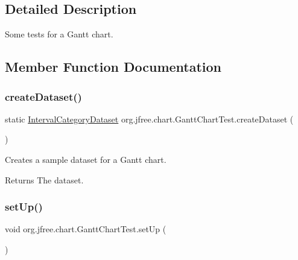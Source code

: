 \subsection{Detailed Description}
Some tests for a Gantt chart. 

\subsection{Member Function Documentation}
\mbox{\label{classorg_1_1jfree_1_1chart_1_1_gantt_chart_test_aa82a6d0e545ee976d47355c0b4ff9355}} 
\subsubsection{\texorpdfstring{create\+Dataset()}{createDataset()}}
{\footnotesize\ttfamily static \mbox{\hyperlink{interfaceorg_1_1jfree_1_1data_1_1category_1_1_interval_category_dataset}{Interval\+Category\+Dataset}} org.\+jfree.\+chart.\+Gantt\+Chart\+Test.\+create\+Dataset (\begin{DoxyParamCaption}{ }\end{DoxyParamCaption})\hspace{0.3cm}{\ttfamily [static]}}

Creates a sample dataset for a Gantt chart.

\begin{DoxyReturn}{Returns}
The dataset. 
\end{DoxyReturn}
\mbox{\label{classorg_1_1jfree_1_1chart_1_1_gantt_chart_test_a01394a12caf440a7b41415f5552538d6}} 
\subsubsection{\texorpdfstring{set\+Up()}{setUp()}}
{\footnotesize\ttfamily void org.\+jfree.\+chart.\+Gantt\+Chart\+Test.\+set\+Up (\begin{DoxyParamCaption}{ }\end{DoxyParamCaption})}

